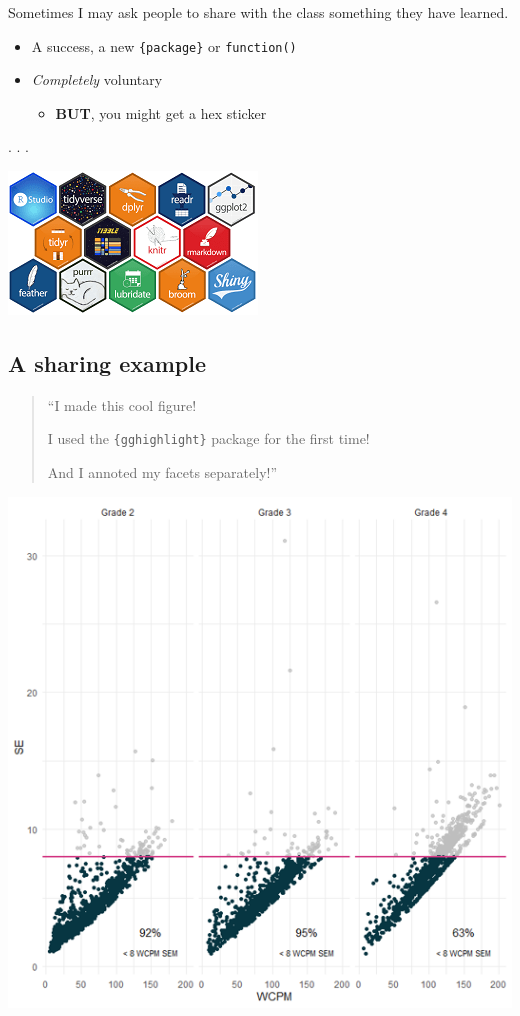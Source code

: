 \documentclass[
  letterpaper,
  DIV=11,
  numbers=noendperiod,
  oneside]{scrartcl}
\providecommand{\tightlist}{%
  \setlength{\itemsep}{0pt}\setlength{\parskip}{0pt}}\usepackage{longtable,booktabs,array}
\begin{document}
Sometimes I may ask people to share with the class something they have
learned.

\begin{itemize}
\tightlist
\item
  A success, a new \texttt{\{package\}} or \texttt{function()}
\item
  \emph{Completely} voluntary

  \begin{itemize}
  \tightlist
  \item
    \textbf{BUT}, you might get a hex sticker 🎉
  \end{itemize}
\end{itemize}

. . .

\includegraphics{w1_intro_files/mediabag/r-packages.png}

\hypertarget{a-sharing-example}{%
\subsection{A sharing example}\label{a-sharing-example}}

\begin{quote}
``I made this cool figure!

I used the \texttt{\{gghighlight\}} package for the first time!

And I annoted my facets separately!''
\end{quote}

\includegraphics{./images/share_ex.png}
\end{document}
